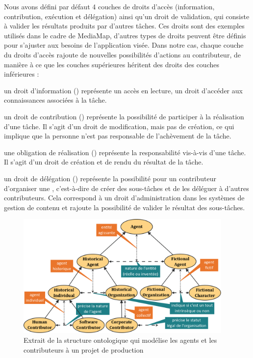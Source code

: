 Nous avons défini par défaut 4 couches de droits d'accès (information, contribution, exécution et délégation) ainsi qu'un droit de validation, qui consiste à valider les résultats produits par d'autres tâches.  
Ces droits sont des exemples utilisés dans le cadre de MediaMap, d'autres types de droits peuvent être définis pour s'ajuster aux besoins de l'application visée.
Dans notre cas, chaque couche du droits d'accès rajoute de nouvelles possibilités d'actions au contributeur, de manière à ce que les couches supérieures héritent des droits des couches inférieures : 
\begin{liste}
	\item un droit d'information () représente un accès en lecture, un droit d'accéder aux connaissances associées à la tâche.

	\item un droit de contribution () représente la possibilité de participer à la réalisation d'une tâche. 
	Il s'agit d'un droit de modification, mais pas de création, ce qui implique que la personne n'est pas responsable de l'achèvement de la tâche.

	\item une obligation de réalisation () représente la responsabilité vis-à-vis d'une tâche. 
	Il s'agit d'un droit de création et de rendu du résultat de la tâche.

	\item un droit de délégation () représente la possibilité pour un contributeur d'organiser une , c'est-à-dire de créer des sous-tâches et de les déléguer à d'autres contributeurs.
	Cela correspond à un droit d'administration dans les systèmes de gestion de contenu et rajoute la possibilité de valider le résultat des sous-tâches.
\end{liste}


\begin{figure}[ht!]
\centering
\includegraphics[width=0.95\textwidth]{./images/SO-Agent-v1.png}
\caption{Extrait de la structure ontologique qui modélise les agents et les contributeurs à un projet de production}
\label{img:so-agent}
\end{figure}

